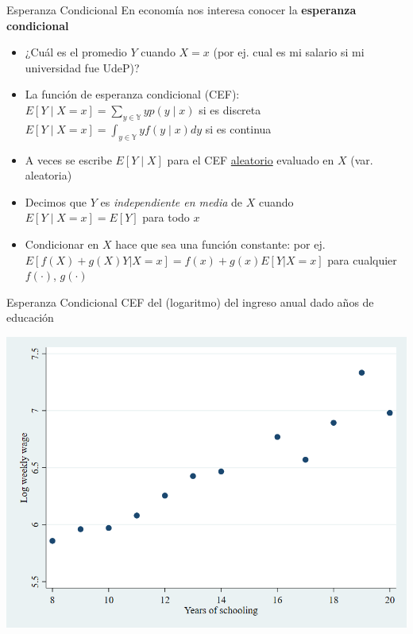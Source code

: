\documentclass[11pt,handout,aspectratio=169]{beamer}
\begin{document}
\begin{frame}{Esperanza Condicional}
\vspace{0.2cm}
En economía nos interesa conocer la \textbf{esperanza condicional}

\begin{itemize}
\item ¿Cuál es el promedio $Y$ cuando $X=x$ (por ej. cual es mi salario si mi universidad fue UdeP)?
\pause 
	
\item La función de esperanza condicional (CEF): \\$E[Y\mid X=x]=\sum_{y\in\mathbb{Y}} y p(y\mid x)$ si es discreta \\
$E[Y\mid X=x]=\int_{y\in\mathbb{Y}} y f(y\mid x) dy$ si es continua

\vspace{0.1cm}\pause{}
\item A veces se escribe $E[Y\mid X]$ para el CEF \uline{aleatorio} evaluado en $X$ (var. aleatoria)
\vspace{0.1cm}\pause{}
\item Decimos que $Y$ es \emph{independiente en media} de $X$ cuando $E[Y\mid X=x]=E[Y]$ para todo $x$
\vspace{0.1cm}\pause{}
\item Condicionar en $X$ hace que sea una función constante: por ej. $E[f(X)+g(X)Y|X=x]=f(x)+g(x)E[Y|X=x]$ para cualquier $f(\cdot)$, $g(\cdot)$
\end{itemize}

\end{frame}


\begin{frame}{Esperanza Condicional}
	\vspace{0.2cm}
	CEF del (logaritmo) del ingreso anual dado años de educación
	
	\begin{center}
		\includegraphics[scale=1.3]{stata2pre.png}
	\end{center}
	
\end{frame}
\end{document}
